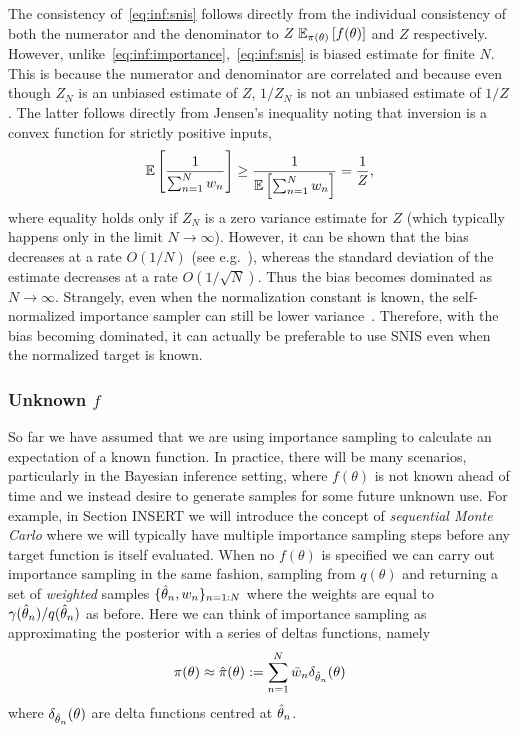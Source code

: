 The consistency of~\eqref{eq:inf:snis} follows
directly from the individual consistency of both the numerator and the denominator to 
$Z\;\mathbb{E}_{\pi(\theta)} \left[f(\theta)\right]$ and $Z$ respectively.
However, unlike~\eqref{eq:inf:importance},~\eqref{eq:inf:snis} is biased estimate
for finite $N$.  This is
because the numerator and denominator are correlated and because 
even though $Z_N$ is an unbiased estimate of $Z$, $1/Z_N$ is not an unbiased
estimate of $1/Z$. The latter follows directly from Jensen's inequality
noting that inversion is a convex function for strictly positive inputs,
\begin{align}
\mathbb{E} \left[\frac{1}{\sum_{n=1}^{N} w_n}\right] \ge \frac{1}{\mathbb{E} \left[\sum_{n=1}^{N} w_n\right]} = \frac{1}{Z},
\end{align}
where equality holds only if $Z_N$ is a zero variance estimate for $Z$ (which
typically happens only in the limit $N\rightarrow\infty$).  However, it can be shown that the
bias decreases at a rate $O(1/N)$ (see e.g.~\cite{doucet2009tutorial}), whereas the
standard deviation of the estimate decreases at a rate $O(1/\sqrt{N})$.  Thus the bias
becomes dominated as $N\rightarrow\infty$.
Strangely, even when the normalization constant
is known, the self-normalized importance sampler can still be lower variance~\citep{owen2013mc}.
Therefore, with the bias becoming dominated, it can actually be preferable to use
SNIS even when the normalized target is known.

\subsubsection{Unknown $f$}
\label{sec:inf:foundation:importance:unk-f}

So far we have assumed that we are using importance sampling to calculate an expectation 
of a known function.  In practice, there will be many scenarios, particularly in the Bayesian inference setting,
where $f(\theta)$ is not known ahead of time and we instead desire to generate samples
for some future unknown use.  For example, in Section INSERT we will introduce the concept
of \emph{sequential Monte Carlo} where we will typically have multiple importance sampling steps
before any target function is itself evaluated.
When no $f(\theta)$ is specified we can carry out importance sampling in the
same fashion, sampling from $q (\theta)$ and returning a set of \emph{weighted} samples
$\{\hat{\theta}_n,w_n\}_{n=1:N}$ where the weights are equal to $\gamma(\hat{\theta}_n) / q(\hat{\theta}_n)$ as before.
Here we can think of importance sampling as approximating the posterior with a series of deltas
functions, namely
\begin{align}
\label{eq:inf:imp-post-est}
\pi (\theta) \approx \hat{\pi}(\theta) := \sum_{n=1}^{N} \bar{w}_n \delta_{\hat{\theta}_n} (\theta)
\end{align}
where $\delta_{\hat{\theta}_n} (\theta)$ are delta functions centred at $\hat{\theta}_n$.

